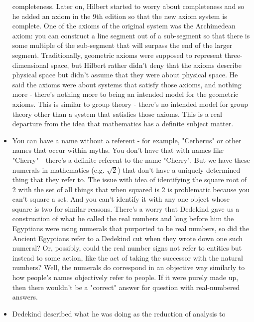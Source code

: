 \documentclass[12pt]{article}
\theoremstyle{definition}
\begin{document}
\begin{itemize}
        completeness. Later on, Hilbert started to worry about completeness and
        so he added an axiom in the 9th edition so that the new axiom system is
        complete. One of the axioms of the original system was the Archimedean
        axiom: you can construct a line segment out of a sub-segment so that
        there is some multiple of the sub-segment that will surpass the end of
        the larger segment. Traditionally, geometric axioms were supposed to
        represent three-dimensional space, but Hilbert rather didn't deny that
        the axioms describe physical space but didn't assume that they were
        about physical space. He said the axioms were about systems that
        satisfy those axioms, and nothing more - there's nothing more to being
        an intended model for the geometric axioms. This is similar to group
        theory - there's no intended model for group theory other than a system
        that satisfies those axioms. This is a real departure from the idea
        that mathematics has a definite subject matter.
    \item
        You can have a name without a referent - for example, "Cerberus" or
        other names that occur within myths. You don't have that with names
        like "Cherry" - there's a definite referent to the name "Cherry". But
        we have these numerals in mathematics (e.g. $\sqrt{2}$) that don't have
        a uniquely determined thing that they refer to. The issue with idea of
        identifying the square root of 2 with the set of all things that when
        squared is 2 is problematic because you can't square a set. And you
        can't identify it with any one object whose square is two for similar
        reasons. There's a worry that Dedekind gave us a construction of what
        he called the real numbers and long before him the Egyptians were using
        numerals that purported to be real numbers, so did the Ancient
        Egyptians refer to a Dedekind cut when they wrote down one such
        numeral? Or, possibly, could the real number signs not refer to
        entities but instead to some action, like the act of taking the
        successor with the natural numbers? Well, the numerals do correspond in
        an objective way similarly to how people's names objectively refer to
        people. If it were purely made up, then there wouldn't be a "correct"
        answer for question with real-numbered answers.
    \item
        Dedekind described what he was doing as the reduction of analysis to

\end{itemize}
\end{document}
